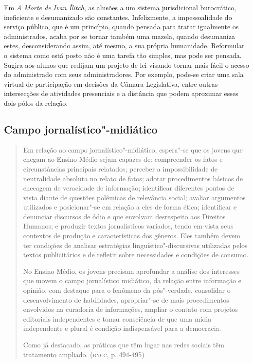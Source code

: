 \documentclass[12pt]{extarticle}
\begin{document}
Em \emph{A Morte de Ivan Ílitch}, as alusões a um sistema
jurisdicional burocrático, ineficiente e desumanizado são
constantes. Infelizmente, a impessoalidade do serviço público, que é
um princípio, quando pensada para tratar igualmente os
administrados, acaba por se tornar também uma mazela, quando
desumaniza estes, desconsiderando assim, até mesmo, a sua própria
humanidade. Reformular o sistema como está posto não é uma tarefa tão simples, mas pode ser pensada. Sugira aos alunos que redijam um projeto de
lei visando tornar mais fácil o acesso do administrado com seus
administradores. Por exemplo, pode-se criar uma sala virtual de
participação em decisões da Câmara Legislativa, entre outras
intersecções de atividades presenciais e a distância que podem
aproximar esses dois pólos da relação.

\subsection{Campo jornalístico"-midiático}

\begin{quote}
Em relação ao campo jornalístico"-midiático, espera"-se que os jovens
que chegam ao Ensino Médio sejam capazes de: compreender os fatos e
circunstâncias principais relatados; perceber a impossibilidade de
neutralidade absoluta no relato de fatos; adotar procedimentos básicos
de checagem de veracidade de informação; identificar diferentes pontos
de vista diante de questões polêmicas de relevância social; avaliar
argumentos utilizados e posicionar"-se em relação a eles de forma ética;
identificar e denunciar discursos de ódio e que envolvam desrespeito aos
Direitos Humanos; e produzir textos jornalísticos variados, tendo em
vista seus contextos de produção e características dos gêneros. Eles
também devem ter condições de analisar estratégias
linguístico"-discursivas utilizadas pelos textos publicitários e de
refletir sobre necessidades e condições de consumo.

No Ensino Médio, os jovens precisam aprofundar a análise dos interesses
que movem o campo jornalístico midiático, da relação entre informação e
opinião, com destaque para o fenômeno da pós"-verdade, consolidar o
desenvolvimento de habilidades, apropriar"-se de mais procedimentos
envolvidos na curadoria de informações, ampliar o contato com projetos
editoriais independentes e tomar consciência de que uma mídia
independente e plural é condição indispensável para a democracia.

Como já destacado, as práticas que têm lugar nas redes sociais têm
tratamento ampliado. (\textsc{bncc}, p. 494-495)
\end{quote}
\end{document}
